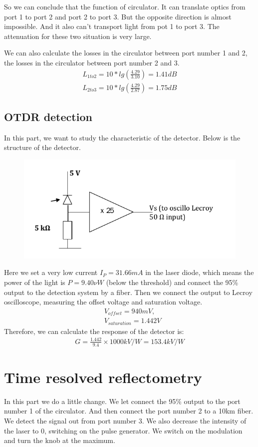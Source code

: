 \documentclass{article}
\begin{document}
	So we can conclude that the function of circulator. It can translate optics from port 1 to port 2 and port 2 to port 3. But the opposite direction is almost impossible. And it also can't transport light from pot 1 to port 3. The attenuation for these two situation is very large.
	
	We can also calculate the losses in the circulator between port number 1 and 2, the losses in the circulator between port number 2 and 3.
	\begin{align*}
		L_{1to2} = 10*lg(\frac{4.29}{3.10})=1.41dB \\
		L_{2to3} = 10*lg(\frac{4.29}{2.87})=1.75dB
	\end{align*}

	\subsection{OTDR detection}
	In this part, we want to study the characteristic of the detector. Below is the structure of the detector.
	\begin{figure} [H]
		\centering
		\includegraphics[width=0.7\linewidth]{"figure 3"}
		\caption{}
		\label{fig:figure-3}
	\end{figure}
	Here we set a very low current $I_P = 31.66mA$ in the laser diode, which means the power of the light is $P = 9.40 \nu W $ (below the threshold) and connect the 95\% output to the detection system by a fiber. Then we connect the output to Lecroy oscilloscope, measuring the offset voltage and saturation voltage.
	\begin{align*}
		&V_{offset}  = 940 mV,  \\
		&V_{saturation} = 1.442V 
	\end{align*}
	Therefore, we can calculate the response of the detector is:
	\begin{align*}
	G = \frac{1.442}{9.4} \times 1000 kV/W = 153.4 kV/W
	\end{align*}
	
	\section{Time resolved reflectometry}
	In this part we do a little change.  We let connect the 95\% output to the port number 1 of the circulator. And then connect the port number 2 to a 10km fiber. We detect the signal out from port number 3. 
	We also decrease the intensity of the laser to 0, switching on the pulse generator. We switch on the modulation and turn the knob at the maximum.
	
\end{document}
